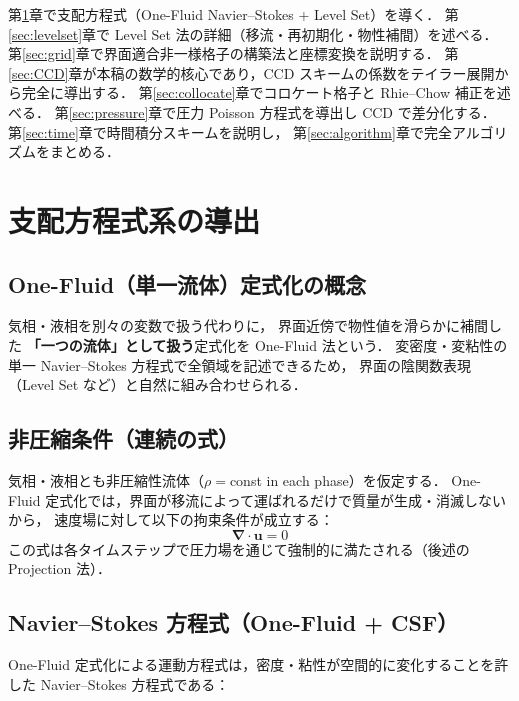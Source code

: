 \documentclass[12pt, a4paper, titlepage]{article}
\newcommand{\jp}[1]{{\normalfont\jpfont #1}}
\newcommand{\bu}{\bm{u}}
\newcommand{\bnabla}{\bm{\nabla}}
\begin{document}
\jp{第\ref{sec:governing}章で支配方程式（One-Fluid Navier--Stokes + Level Set）を導く．
第\ref{sec:levelset}章で Level Set 法の詳細（移流・再初期化・物性補間）を述べる．
第\ref{sec:grid}章で界面適合非一様格子の構築法と座標変換を説明する．
第\ref{sec:CCD}章が本稿の数学的核心であり，CCD スキームの係数をテイラー展開から完全に導出する．
第\ref{sec:collocate}章でコロケート格子と Rhie--Chow 補正を述べる．
第\ref{sec:pressure}章で圧力 Poisson 方程式を導出し CCD で差分化する．
第\ref{sec:time}章で時間積分スキームを説明し，
第\ref{sec:algorithm}章で完全アルゴリズムをまとめる．}


\section{\jp{支配方程式系の導出}}
\label{sec:governing}

\subsection{\jp{One-Fluid（単一流体）定式化の概念}}

\jp{気相・液相を別々の変数で扱う代わりに，
界面近傍で物性値を滑らかに補間した \textbf{「一つの流体」として扱う}定式化を One-Fluid 法という．
変密度・変粘性の単一 Navier--Stokes 方程式で全領域を記述できるため，
界面の陰関数表現（Level Set など）と自然に組み合わせられる．}

\subsection{\jp{非圧縮条件（連続の式）}}

\jp{気相・液相とも非圧縮性流体（$\rho = $const in each phase）を仮定する．
One-Fluid 定式化では，界面が移流によって運ばれるだけで質量が生成・消滅しないから，
速度場に対して以下の拘束条件が成立する：}
\begin{equation}
  \bnabla \cdot \bu = 0
  \label{eq:continuity}
\end{equation}
\jp{この式は各タイムステップで圧力場を通じて強制的に満たされる（後述の Projection 法）．}

\subsection{Navier--Stokes \jp{方程式（One-Fluid + CSF）}}

\jp{One-Fluid 定式化による運動方程式は，密度・粘性が空間的に変化することを許した
Navier--Stokes 方程式である：}
\end{document}
